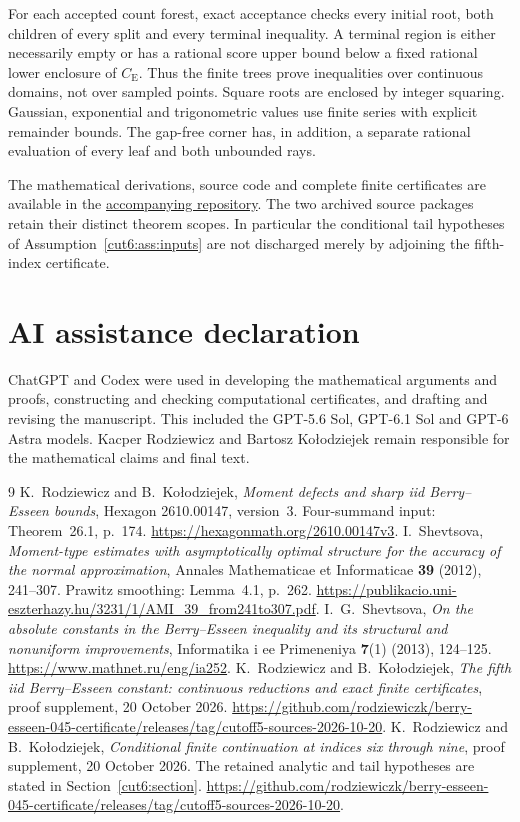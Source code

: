\documentclass[11pt,a4paper]{article}
\theoremstyle{definition}
\newcommand{\CE}{C_{\mathrm E}}
\begin{document}
For each accepted count forest, exact acceptance checks every initial
root, both children of every split and every terminal inequality.
A terminal region is either necessarily empty or has a rational score
upper bound below a fixed rational lower enclosure of $\CE$.
Thus the finite trees prove inequalities over continuous domains, not
over sampled points. Square roots are enclosed by integer squaring.
Gaussian, exponential and trigonometric values use finite series with
explicit remainder bounds. The gap-free corner has, in addition, a
separate rational evaluation of every leaf and both unbounded rays.

The mathematical derivations, source code and complete finite
certificates are available in the
\href{https://github.com/rodziewiczk/berry-esseen-045-certificate/tree/main/moment-defects}
{accompanying repository}.
The two archived source packages \cite{C5ProofSupplement,Cutoff6Continuation}
retain their distinct theorem scopes. In particular the conditional
tail hypotheses of Assumption~\ref{cut6:ass:inputs} are not discharged
merely by adjoining the fifth-index certificate.

\section*{AI assistance declaration}
ChatGPT and Codex were used in developing the mathematical arguments
and proofs, constructing and checking computational certificates, and
drafting and revising the manuscript. This included the GPT-5.6 Sol,
GPT-6.1 Sol and GPT-6 Astra models. Kacper Rodziewicz and Bartosz
Ko{\l}odziejek remain responsible for the mathematical claims and final text.

\begin{thebibliography}{9}
 K.~Rodziewicz and B.~Ko{\l}odziejek,
\emph{Moment defects and sharp iid Berry--Esseen bounds},
Hexagon 2610.00147, version~3. Four-summand input:
Theorem~26.1, p.~174.
\url{https://hexagonmath.org/2610.00147v3}.
 I.~Shevtsova,
\emph{Moment-type estimates with asymptotically optimal structure for the
accuracy of the normal approximation},
Annales Mathematicae et Informaticae \textbf{39} (2012), 241--307.
Prawitz smoothing: Lemma~4.1, p.~262.
\url{https://publikacio.uni-eszterhazy.hu/3231/1/AMI_39_from241to307.pdf}.
 I.~G.~Shevtsova,
\emph{On the absolute constants in the Berry--Esseen inequality and its
structural and nonuniform improvements},
Informatika i ee Primeneniya \textbf{7}(1) (2013), 124--125.
\url{https://www.mathnet.ru/eng/ia252}.
 K.~Rodziewicz and B.~Ko{\l}odziejek,
\emph{The fifth iid Berry--Esseen constant: continuous reductions and
exact finite certificates}, proof supplement, 20 October 2026.
\url{https://github.com/rodziewiczk/berry-esseen-045-certificate/releases/tag/cutoff5-sources-2026-10-20}.
 K.~Rodziewicz and B.~Ko{\l}odziejek,
\emph{Conditional finite continuation at indices six through nine},
proof supplement, 20 October 2026. The retained analytic and tail
hypotheses are stated in Section~\ref{cut6:section}.
\url{https://github.com/rodziewiczk/berry-esseen-045-certificate/releases/tag/cutoff5-sources-2026-10-20}.
\end{thebibliography}
\end{document}
